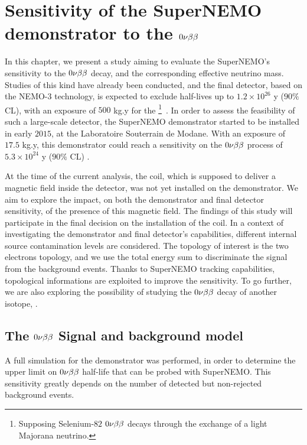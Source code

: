 \chapter{Sensitivity of the SuperNEMO demonstrator to the $0\nu\beta\beta$}
\label{ch:sensitivity}

In this chapter, we present a study aiming to evaluate the SuperNEMO's sensitivity to the $0\nu\beta\beta$ decay, and the corresponding effective neutrino mass.
Studies of this kind have already been conducted, and the final detector, based on the NEMO-$3$ technology, is expected to exclude half-lives up to $1.2\times 10^{26}$ y ($90\%$ CL), with an exposure of $500$ kg.y for the \Se\footnote{Supposing Selenium-$82$ $0\nu\beta\beta$ decays through the exchange of a light Majorana neutrino.}~\cite{art:SuperNEMO2010}.
In order to assess the feasibility of such a large-scale detector, the SuperNEMO demonstrator started to be installed in early $2015$, at the Laboratoire Souterrain de Modane.
With an exposure of $17.5$ kg.y, this demonstrator could reach a sensitivity on the $0\nu\beta\beta$ process of $5.3\times 10^{24}$ y ($90\%$ CL) \cite{CalvezThesis}.

At the time of the current analysis, the coil, which is supposed to deliver a magnetic field inside the detector, was not yet installed on the demonstrator.
We aim to explore the impact, on both the demonstrator and final detector sensitivity, of the presence of this magnetic field.
The findings of this study will participate in the final decision on the installation of the coil.
In a context of investigating the demonstrator and final detector's capabilities, different internal source contamination levels are considered.
The topology of interest is the two electrons topology, and we use the total energy sum to discriminate the signal from the background events.
Thanks to SuperNEMO tracking capabilities, topological informations are exploited to improve the sensitivity.
To go further, we are also exploring the possibility of studying the $0\nu\beta\beta$ decay of another isotope, \Nd.

\section{The $0\nu\beta\beta$ Signal and background model}
\label{sec:sensitivity_simus}

A full simulation for the demonstrator was performed, in order to determine the upper limit on $0\nu\beta\beta$ half-life that can be probed with SuperNEMO.
This sensitivity greatly depends on the number of detected but non-rejected background events.

